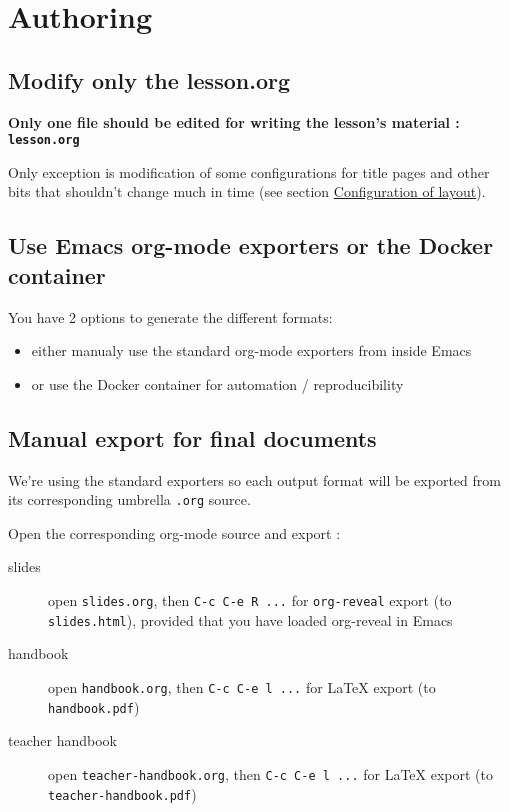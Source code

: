 \documentclass[a4paper]{article}
\begin{document}
\section{Authoring}
\label{sec:orge1f594b}
\subsection{Modify only the lesson.org}
\label{sec:org50bc479}

\textbf{Only one file should be edited for writing the lesson's material : \texttt{lesson.org}}

Only exception is modification of some configurations for title pages
and other bits that shouldn't change much in time (see section \hyperref[sec:orgd2c7642]{Configuration of layout}).

\subsection{Use Emacs org-mode exporters or the Docker container}
\label{sec:orgce6ab05}

You have 2 options to generate the different formats:
\begin{itemize}
\item either manualy use the standard org-mode exporters from inside Emacs
\item or use the Docker container for automation / reproducibility
\end{itemize}

\subsection{Manual export for final documents}
\label{sec:org2a2597a}

We're using the standard exporters so each output format will be exported from its corresponding umbrella \texttt{.org} source.

Open the corresponding org-mode source and export :

\begin{description}
\item[{slides}] open \texttt{slides.org}, then \texttt{C-c C-e R ...} for \texttt{org-reveal} export (to \texttt{slides.html}), provided that you have loaded org-reveal in Emacs
\item[{handbook}] open \texttt{handbook.org}, then \texttt{C-c C-e l ...} for \LaTeX{} export (to \texttt{handbook.pdf})
\item[{teacher handbook}] open \texttt{teacher-handbook.org}, then \texttt{C-c C-e l ...} for \LaTeX{} export (to \texttt{teacher-handbook.pdf})
\end{description}
\end{document}
